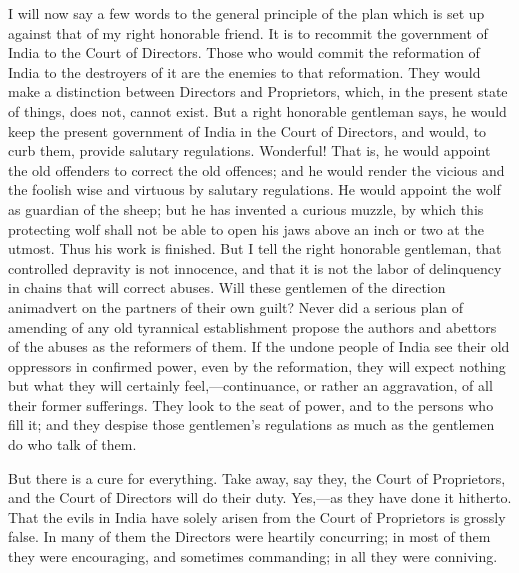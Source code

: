 I will now say a few words to the general principle of the plan which is set up against that of my right honorable friend. It is to recommit the government of India to the Court of Directors. Those who would commit the reformation of India to the destroyers of it are the enemies to that reformation. They would make a distinction between Directors and Proprietors, which, in the present state of things, does not, cannot exist. But a right honorable gentleman says, he would keep the present government of India in the Court of Directors, and would, to curb them, provide salutary regulations. Wonderful! That is, he would appoint the old offenders to correct the old offences; and he would render the vicious and the foolish wise and virtuous by salutary regulations. He would appoint the wolf as guardian of the sheep; but he has invented a curious muzzle, by which this protecting wolf shall not be able to open his jaws above an inch or two at the utmost. Thus his work is finished. But I tell the right honorable gentleman, that controlled depravity is not innocence, and that it is not the labor of delinquency in chains that will correct abuses. Will these gentlemen of the direction animadvert on the partners of their own guilt? Never did a serious plan of amending of any old tyrannical establishment propose the authors and abettors of the abuses as the reformers of them. If the undone people of India see their old oppressors in confirmed power, even by the reformation, they will expect nothing but what they will certainly feel,—continuance, or rather an aggravation, of all their former sufferings. They look to the seat of power, and to the persons who fill it; and they despise those gentlemen's regulations as much as the gentlemen do who talk of them.

But there is a cure for everything. Take away, say they, the Court of Proprietors, and the Court of Directors will do their duty. Yes,—as they have done it hitherto. That the evils in India have solely arisen from the Court of Proprietors is grossly false. In many of them the Directors were heartily concurring; in most of them they were encouraging, and sometimes commanding; in all they were conniving.

